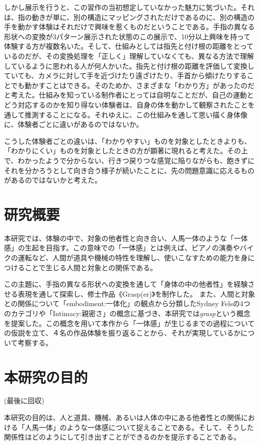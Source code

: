 しかし展示を行うと、この習作の当初想定していなかった魅力に気づいた。それは、指の動きが単に、別の構造にマッピングされただけであるのに、別の構造の手を動かす体験はそれだけで興味を惹くものだということである。手指の異なる形状への変換が3パターン展示された状態のこの展示で、10分以上興味を持って体験する方が複数名いた。そして、仕組みとしては指先と付け根の距離をとっているのだが、その変換処理を「正しく」理解していなくても、異なる方法で理解しているように思われる人が何人かいた。指先と付け根の距離を評価して変換していても、カメラに対して手を近づけたり遠ざけたり、手首から傾けたりすることでも動かすことはできる。そのためか、さまざまな「わかり方」があったのだと考えた。仕組みを知っている制作者にとっては自明なことだが、自己の運動とどう対応するのかを知り得ない体験者は、自身の体を動かして観察されたことを通して推測することになる。それゆえに、この仕組みを通して思い描く身体像に、体験者ごとに違いがあるのではないか。

こうした体験者ごとの違いは、「わかりやすい」ものを対象としたときよりも、「わかりにくい」ものを対象としたときの方が顕著に現れると考えた。その上で、わかったようで分からない、行きつ戻りつな感覚に陥りながらも、飽きずにそれを分かろうとして向き合う様子が続いたことに、先の問題意識に応えるものがあるのではないかと考えた。


\section{研究概要}
本研究では、体験の中で、対象の他者性と向き合い、人馬一体のような「一体感」の生起を目指す。この意味での「一体感」とは例えば、ピアノの演奏やバイクの運転など、人間が道具や機械の特性を理解し、使いこなすための能力を身につけることで生じる人間と対象との関係である。

この主題に、手指の異なる形状への変換を通して「身体の中の他者性」を経験させる表現を通して探索し、修士作品《Grasp(er)》を制作した。
また、人間と対象との関係について「embodiment:一体化」の観点から分類したSydney Felsの4つのカテゴリや「Intimacy:親密さ」の概念に基づき、本研究では\textit{grasp}という概念を提案した。この概念を用いて本作から「一体感」が生じるまでの過程についての仮説を立て、４名の作品体験を振り返ることから、それが実現しているかについて考察する。

\section{本研究の目的}
(最後に回収)

本研究の目的は、人と道具、機械、あるいは人体の中にある他者性との関係における「人馬一体」のような一体感について捉えることである。そして、そうした関係性はどのようにして引き出すことができるのかを提示することである。

